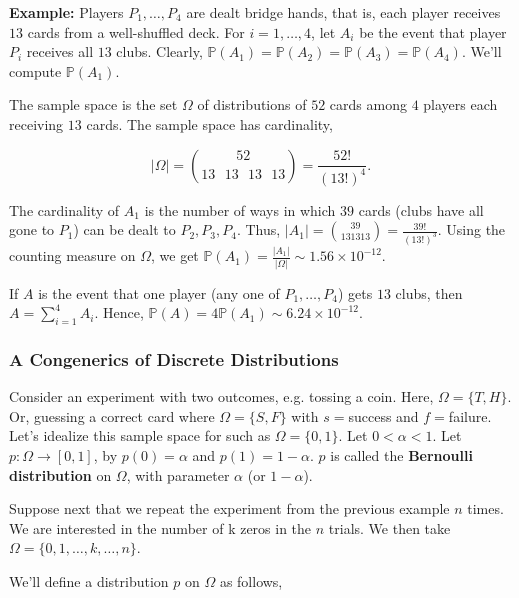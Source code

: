 \documentclass[12pt]{article}
\newcommand{\prob}[1]{\mathbb{P}(#1)}
\begin{document}
\begin{tcolorbox}
\textbf{Example:} Players $P_1, \ldots, P_4$ are dealt bridge hands, that is, each player receives $13$ cards from a well-shuffled deck. For $i = 1, \ldots, 4$, let $A_i$ be the event that player $P_i$ receives all $13$ clubs. Clearly, $\prob{A_1} = \prob{A_2} = \prob{A_3} = \prob{A_4}$. We'll compute $\prob{A_1}$.

\noindent
The sample space is the set $\Omega$ of distributions of $52$ cards among $4$ players each receiving $13$ cards. The sample space has cardinality, 

\begin{equation*}
\lvert \Omega \rvert = {52 \choose 13 \text{ } 13 \text{ } 13 \text{ } 13 } = \frac{52!}{(13!)^4}.
\end{equation*}

\noindent
The cardinality of $A_1$ is the number of ways in which $39$ cards (clubs have all gone to $P_1$) can be dealt to $P_2, P_3, P_4$. Thus, $\lvert A_1 \rvert = {39 \choose 13 13 13} = \frac{39!}{(13!)^3}$. Using the counting measure on $\Omega$, we get $\prob{A_1} = \frac{\lvert A_1 \rvert}{\lvert \Omega \rvert} \sim 1.56 \times 10^{-12}$.

\noindent
If $A$ is the event that one player (any one of $P_1, \ldots, P_4$) gets $13$ clubs, then $A = \sum_{i=1}^{4} A_i $. Hence, $\prob{A} = 4 \prob{A_1} \sim 6.24 \times 10^{-12}$.
\end{tcolorbox}

\subsubsection*{A Congenerics of Discrete Distributions}
\noindent
Consider an experiment with two outcomes, e.g. tossing a coin. Here, $\Omega = \{ T, H \}$. Or, guessing a correct card where $\Omega = \{ S, F \}$ with $s=$success and $f=$failure. Let's idealize this sample space for such as $\Omega = \{ 0, 1 \}$. Let $0 < \alpha < 1$. Let $p : \Omega \rightarrow [0,1]$, by $p(0) = \alpha$ and $p(1) = 1- \alpha$. $p$ is called the \textbf{Bernoulli distribution} on $\Omega$, with parameter $\alpha$ (or $1- \alpha$).

\noindent
Suppose next that we repeat the experiment from the previous example $n$ times. We are interested in the number of k zeros in the $n$ trials. We then take $\Omega = \{ 0, 1, \ldots, k, \ldots, n \}$.

\noindent
We'll define a distribution $p$ on $\Omega$ as follows,
\end{document}
